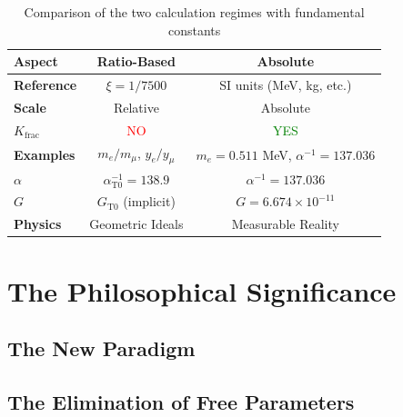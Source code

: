 	\begin{table}[h]
		\centering
		\begin{tabular}{lcc}
			\toprule
			\textbf{Aspect} & \textbf{Ratio-Based} & \textbf{Absolute} \\
			\midrule
			\textbf{Reference} & $\xi = 1/7500$ & SI units (MeV, kg, etc.) \\
			\textbf{Scale} & Relative & Absolute \\
			\textbf{$K_{\text{frac}}$} & \textcolor{red}{NO} & \textcolor{green}{YES} \\
			\textbf{Examples} & $m_e/m_μ$, $y_e/y_μ$ & $m_e = 0.511$ MeV, $\alpha^{-1} = 137.036$ \\
			\textbf{$\alpha$} & $\alpha_{\text{T0}}^{-1} = 138.9$ & $\alpha^{-1} = 137.036$ \\
			\textbf{$G$} & $G_{\text{T0}}$ (implicit) & $G = 6.674\times10^{-11}$ \\
			\textbf{Physics} & Geometric Ideals & Measurable Reality \\
			\bottomrule
		\end{tabular}
		\caption{Comparison of the two calculation regimes with fundamental constants}
	\end{table}
	
	\section{The Philosophical Significance}
	
	\subsection{The New Paradigm}
	
	\begin{center}
	\end{center}
	
	\subsection{The Elimination of Free Parameters}
	
